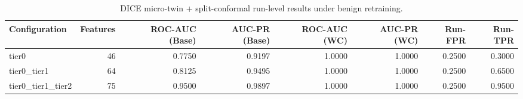 \begin{table}[t]
\centering
\caption{DICE micro-twin + split-conformal run-level results under benign retraining.}
\label{tab:dice_full_overall}
\footnotesize
\begin{tabular}{lrrrrrrr}
\toprule
Configuration & Features & ROC-AUC (Base) & AUC-PR (Base) & ROC-AUC (WC) & AUC-PR (WC) & Run-FPR & Run-TPR \\
\midrule
tier0 & 46 & 0.7750 & 0.9197 & 1.0000 & 1.0000 & 0.2500 & 0.3000 \\
tier0_tier1 & 64 & 0.8125 & 0.9495 & 1.0000 & 1.0000 & 0.2500 & 0.6500 \\
tier0_tier1_tier2 & 75 & 0.9500 & 0.9897 & 1.0000 & 1.0000 & 0.2500 & 0.9500 \\
\bottomrule
\end{tabular}

\end{table}
